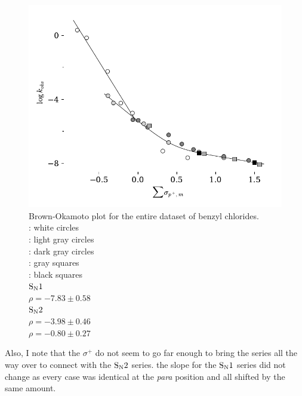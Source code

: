 \documentclass{tufte-handout}
\begin{document}
\begin{figure}[h!]
  \centering
  \includegraphics[scale=0.8]{images/plot9.pdf}
  \caption[-0mm]{Brown-Okamoto plot for the entire dataset of benzyl chlorides.  \vspace{2mm} \\
    : white circles  \\
  : light gray circles  \\
  : dark gray circles  \\
  : gray squares   \\
  : black squares  \vspace{2mm}  \\

    {$\rm S_N1$}  \\
    \hspace{3mm} $\rho = -7.83 \pm 0.58$ \vspace{2mm} \\
    {$\rm S_N2$}  \\
    \hspace{3mm} $\rho = -3.98 \pm 0.46$  \\
    \hspace{3mm} $\rho = -0.80 \pm 0.27$ \vspace{2mm} \\

   
 } 
  \label{fig:YK3}
\end{figure}

Also, I note that the $\sigma^+$ do not seem to go far enough to bring the  series all the way over to connect with the $\rm S_N2$ series. the slope for the $\rm S_N1$  series did not change as every case was identical at the \textit{para} position and all shifted by the same amount.
\end{document}

